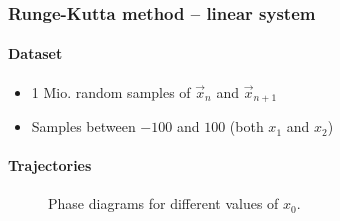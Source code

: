 \begin{frame}
	\frametitle{Runge-Kutta method -- linear system}
	\paragraph{Dataset}\vspace{-2mm}
	\begin{itemize}
		\item 1 Mio. random samples of $\overrightarrow{x}_{n}$ and $\overrightarrow{x}_{n+1}$
		\item Samples between $-100$ and $100$ (both $x_1$ and $x_2$)
	\end{itemize}
	\paragraph{Trajectories}\vspace{-2mm}
	\begin{figure}[H]
		\quad
		\quad
		\caption{Phase diagrams for different values of $x_0$.}
	\end{figure}
\end{frame}

